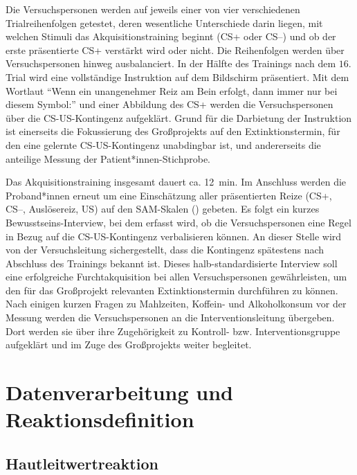 						Die Versuchspersonen werden auf jeweils einer von vier verschiedenen Trialreihenfolgen getestet, deren wesentliche Unterschiede darin liegen, mit welchen Stimuli das Akquisitionstraining beginnt (CS+ oder CS--) und ob der erste präsentierte CS+ verstärkt wird oder nicht. Die Reihenfolgen werden über Versuchspersonen hinweg ausbalanciert. 
						In der Hälfte des Trainings nach dem $16.$ Trial wird eine vollständige Instruktion auf dem Bildschirm präsentiert. Mit dem Wortlaut "`Wenn ein unangenehmer Reiz am Bein erfolgt, dann immer nur bei diesem Symbol:"' und einer Abbildung des CS+ werden die Versuchspersonen über die CS-US-Kontingenz aufgeklärt.
						Grund für die Darbietung der Instruktion ist einerseits die Fokussierung des Großprojekts auf den Extinktionstermin, für den eine gelernte CS-US-Kontingenz unabdingbar ist, und andererseits die anteilige Messung der Patient*innen-Stichprobe.
						
						Das Akquisitionstraining insgesamt dauert ca. \SI{12}{\minute}. Im Anschluss werden die Proband*innen erneut um eine Einschätzung aller präsentierten Reize (CS+, CS--, Auslösereiz, US) auf den SAM-Skalen () gebeten. Es folgt ein kurzes Bewusstseins-Interview, bei dem erfasst wird, ob die Versuchspersonen eine Regel in Bezug auf die CS-US-Kontingenz verbalisieren können. An dieser Stelle wird von der Versuchsleitung sichergestellt, dass die Kontingenz spätestens nach Abschluss des Trainings bekannt ist. Dieses halb-standardisierte Interview soll eine erfolgreiche Furchtakquisition bei allen Versuchspersonen gewährleisten, um den für das Großprojekt relevanten Extinktionstermin durchführen zu können. 
						Nach einigen kurzen Fragen zu Mahlzeiten, Koffein- und Alkoholkonsum vor der Messung werden die Versuchspersonen an die Interventionsleitung übergeben. Dort werden sie über ihre Zugehörigkeit zu Kontroll- bzw. Interventionsgruppe aufgeklärt und im Zuge des Großprojekts weiter begleitet.
					 


	\section{Datenverarbeitung und Reaktionsdefinition}\label{dataprocessing}

		\subsection{Hautleitwertreaktion}\label{edascore}
			
